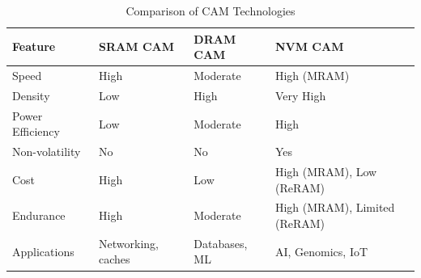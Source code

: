 \begin{table}[t]
\centering
\caption{Comparison of CAM Technologies}
\label{tab:cam_comparison}
\begin{tabular}{|l|l|l|l|}
\hline
\textbf{Feature} & \textbf{SRAM CAM} & \textbf{DRAM CAM} & \textbf{NVM CAM} \\ \hline
Speed & High & Moderate & High (MRAM) \\ \hline
Density & Low & High & Very High \\ \hline
Power Efficiency & Low & Moderate & High \\ \hline
Non-volatility & No & No & Yes \\ \hline
Cost & High & Low & High (MRAM), Low (ReRAM) \\ \hline
Endurance & High & Moderate & High (MRAM), Limited (ReRAM) \\ \hline
Applications & Networking, caches & Databases, ML & AI, Genomics, IoT \\ \hline
\end{tabular}
\end{table}
